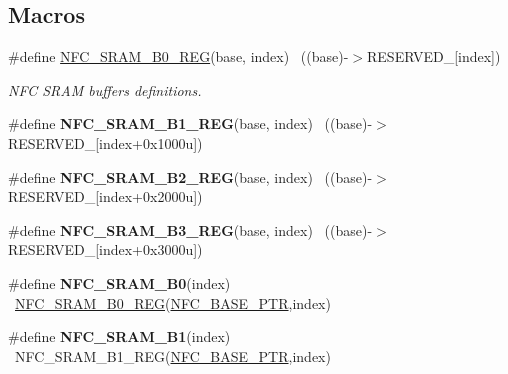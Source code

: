 \subsection*{Macros}
\begin{DoxyCompactItemize}
\item 
\#define \hyperlink{group___n_f_c___peripheral_ga32c5323845ab95c7cfead7aae2bf765c}{N\+F\+C\+\_\+\+S\+R\+A\+M\+\_\+\+B0\+\_\+\+R\+E\+G}(base,  index)          ~((base)-\/$>$R\+E\+S\+E\+R\+V\+E\+D\+\_\mbox{[}index\mbox{]})
\begin{DoxyCompactList}\small\item\em N\+F\+C S\+R\+A\+M buffers definitions. \end{DoxyCompactList}\item 
\hypertarget{group___n_f_c___peripheral_ga4a2ad850f81578329998cf6489f3a92e}{}\#define {\bfseries N\+F\+C\+\_\+\+S\+R\+A\+M\+\_\+\+B1\+\_\+\+R\+E\+G}(base,  index)          ~((base)-\/$>$R\+E\+S\+E\+R\+V\+E\+D\+\_\mbox{[}index+0x1000u\mbox{]})\label{group___n_f_c___peripheral_ga4a2ad850f81578329998cf6489f3a92e}

\item 
\hypertarget{group___n_f_c___peripheral_gaaca05dee0a187dae2faa7beb848031b1}{}\#define {\bfseries N\+F\+C\+\_\+\+S\+R\+A\+M\+\_\+\+B2\+\_\+\+R\+E\+G}(base,  index)          ~((base)-\/$>$R\+E\+S\+E\+R\+V\+E\+D\+\_\mbox{[}index+0x2000u\mbox{]})\label{group___n_f_c___peripheral_gaaca05dee0a187dae2faa7beb848031b1}

\item 
\hypertarget{group___n_f_c___peripheral_ga5f4f861f7b942b9e48e3c16281c6e46d}{}\#define {\bfseries N\+F\+C\+\_\+\+S\+R\+A\+M\+\_\+\+B3\+\_\+\+R\+E\+G}(base,  index)          ~((base)-\/$>$R\+E\+S\+E\+R\+V\+E\+D\+\_\mbox{[}index+0x3000u\mbox{]})\label{group___n_f_c___peripheral_ga5f4f861f7b942b9e48e3c16281c6e46d}

\item 
\hypertarget{group___n_f_c___peripheral_ga123ff98e0d09376130711cae6f28126d}{}\#define {\bfseries N\+F\+C\+\_\+\+S\+R\+A\+M\+\_\+\+B0}(index)                              ~\hyperlink{group___n_f_c___peripheral_ga32c5323845ab95c7cfead7aae2bf765c}{N\+F\+C\+\_\+\+S\+R\+A\+M\+\_\+\+B0\+\_\+\+R\+E\+G}(\hyperlink{group___n_f_c___peripheral_ga0777810803d598d0a435f71acd967563}{N\+F\+C\+\_\+\+B\+A\+S\+E\+\_\+\+P\+T\+R},index)\label{group___n_f_c___peripheral_ga123ff98e0d09376130711cae6f28126d}

\item 
\hypertarget{group___n_f_c___peripheral_ga0b1f9e3502e79137e6af21235725f62d}{}\#define {\bfseries N\+F\+C\+\_\+\+S\+R\+A\+M\+\_\+\+B1}(index)                              ~N\+F\+C\+\_\+\+S\+R\+A\+M\+\_\+\+B1\+\_\+\+R\+E\+G(\hyperlink{group___n_f_c___peripheral_ga0777810803d598d0a435f71acd967563}{N\+F\+C\+\_\+\+B\+A\+S\+E\+\_\+\+P\+T\+R},index)\label{group___n_f_c___peripheral_ga0b1f9e3502e79137e6af21235725f62d}


\end{DoxyCompactItemize}

